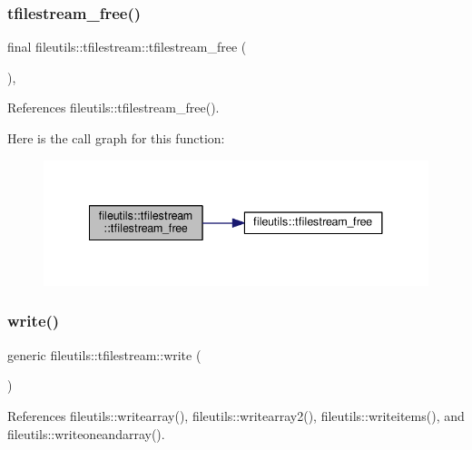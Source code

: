 \subsubsection{\texorpdfstring{tfilestream\+\_\+free()}{tfilestream\_free()}}
{\footnotesize\ttfamily final fileutils\+::tfilestream\+::tfilestream\+\_\+free (\begin{DoxyParamCaption}{ }\end{DoxyParamCaption})\hspace{0.3cm}{\ttfamily [final]}, {\ttfamily [private]}}



References fileutils\+::tfilestream\+\_\+free().

Here is the call graph for this function\+:
\nopagebreak
\begin{figure}[H]
\begin{center}
\leavevmode
\includegraphics[width=338pt]{structfileutils_1_1tfilestream_ab3041e1c0b828404ec22a934f90244f1_cgraph}
\end{center}
\end{figure}
\mbox{\label{structfileutils_1_1tfilestream_afac6692bb5fad57e18abea90570da6d3}} 
\subsubsection{\texorpdfstring{write()}{write()}}
{\footnotesize\ttfamily generic fileutils\+::tfilestream\+::write (\begin{DoxyParamCaption}{ }\end{DoxyParamCaption})\hspace{0.3cm}{\ttfamily [private]}}



References fileutils\+::writearray(), fileutils\+::writearray2(), fileutils\+::writeitems(), and fileutils\+::writeoneandarray().

